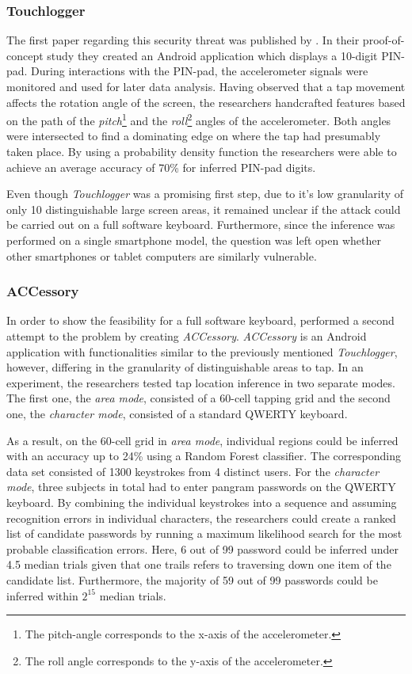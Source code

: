 \subsubsection{Touchlogger}

The first paper regarding this security threat was published by \citeauthor{Touchlogger}. In their proof-of-concept study they created an Android application which displays a 10-digit PIN-pad. During interactions with the PIN-pad, the accelerometer signals were monitored and used for later data analysis. Having observed that a tap movement affects the rotation angle of the screen, the researchers handcrafted features based on the path of the \textit{pitch}\footnote{The pitch-angle corresponds to the x-axis of the accelerometer.} and the \textit{roll}\footnote{The roll angle corresponds to the y-axis of the accelerometer.} angles of the accelerometer. Both angles were intersected to find a dominating edge on where the tap had presumably taken place. By using a probability density function the researchers were able to achieve an average accuracy of 70\% for inferred PIN-pad digits.

Even though \textit{Touchlogger} was a promising first step, due to it's low granularity of only 10 distinguishable large screen areas, it remained unclear if the attack could be carried out on a full software keyboard. Furthermore, since the inference was performed on a single smartphone model, the question was left open whether other smartphones or tablet computers are similarly vulnerable.

\subsubsection{ACCessory}

In order to show the feasibility for a full software keyboard, \citeauthor{Accessory} performed a second attempt to the problem by creating \textit{ACCessory}. \textit{ACCessory} is an Android application with functionalities similar to the previously mentioned \textit{Touchlogger}, however, differing in the granularity of distinguishable areas to tap. In an experiment, the researchers tested tap location inference in two separate modes. The first one, the \textit{area mode}, consisted of a 60-cell tapping grid and the second one, the \textit{character mode}, consisted of a standard QWERTY keyboard. 

As a result, on the 60-cell grid in \textit{area mode}, individual regions could be inferred with an accuracy up to 24\% using a Random Forest classifier. The corresponding data set consisted of 1300 keystrokes from 4 distinct users. 
For the \textit{character mode}, three subjects in total had to enter pangram passwords on the QWERTY keyboard. By combining the individual keystrokes into a sequence and assuming recognition errors in individual characters, the researchers could create a ranked list of candidate passwords by running a maximum likelihood search for the most probable classification errors. Here, 6 out of 99 password could be inferred under 4.5 median trials given that one trails refers to traversing down one item of the candidate list. Furthermore, the majority of 59 out of 99 passwords could be inferred within $2^{15}$ median trials.

